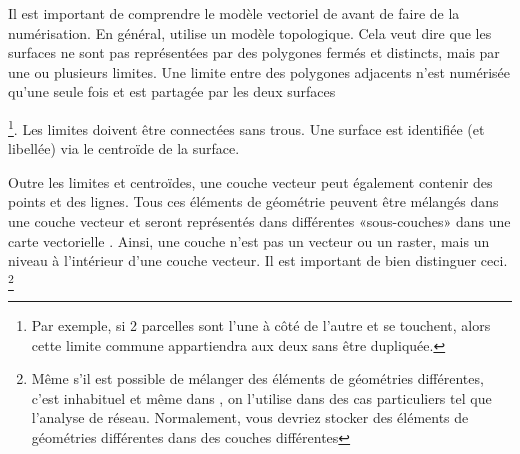 Il est important de comprendre le modèle vectoriel de \grass avant de faire de la numérisation. En général, \grass utilise un modèle topologique. Cela veut dire que les surfaces ne sont pas représentées par des polygones fermés et distincts, mais par une ou plusieurs limites. Une limite entre des polygones adjacents n'est numérisée qu'une seule fois et est partagée par les deux surfaces{\footnote{Par exemple, si 2 parcelles sont l'une à côté de l'autre et se touchent, alors cette limite commune appartiendra aux deux sans être dupliquée.}. Les limites doivent être connectées sans trous. Une surface est identifiée (et libellée) via le centroïde de la surface.


Outre les limites et centroïdes, une couche vecteur peut également contenir des points et des lignes. Tous ces éléments de géométrie peuvent être mélangés dans une couche vecteur et seront représentés dans différentes «sous-couches» dans une carte vectorielle \grass. Ainsi, une couche \grass n'est pas un vecteur ou un raster, mais un niveau à l'intérieur d'une couche vecteur. Il est important de bien distinguer ceci.
\footnote{Même s'il est possible de mélanger des éléments de géométries différentes, c'est inhabituel et même dans \grass, on l'utilise dans des cas particuliers tel que l'analyse de réseau. Normalement, vous devriez stocker des éléments de géométries différentes dans des couches différentes}


}
